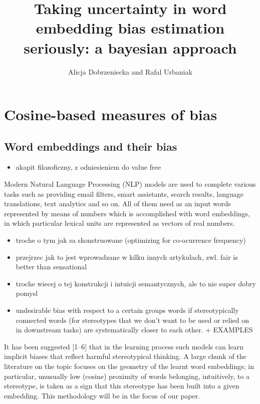 \documentclass[
  10pt,
  dvipsnames,enabledeprecatedfontcommands]{scrartcl}
\title{Taking uncertainty in word embedding bias estimation seriously: a
bayesian approach}
\author{Alicja Dobrzeniecka and Rafal Urbaniak}
\date{}
\providecommand{\tightlist}{%
  \setlength{\itemsep}{0pt}\setlength{\parskip}{0pt}}
\begin{document}
\maketitle

\hypertarget{cosine-based-measures-of-bias}{%
\section{Cosine-based measures of
bias}\label{cosine-based-measures-of-bias}}

\hypertarget{word-embeddings-and-their-bias}{%
\subsection{Word embeddings and their
bias}\label{word-embeddings-and-their-bias}}

\begin{itemize}
\tightlist
\item
  akapit filozoficzny, z odniesieniem do value free
\end{itemize}

Modern Natural Language Processing (NLP) models are used to complete
various tasks such as providing email filters, smart assistants, search
results, language translations, text analytics and so on. All of them
need as an input words represented by means of numbers which is
accomplished with word embeddings, in which particular lexical units are
represented as vectors of real numbers.

\begin{itemize}
\item
  troche o tym jak sa skonstruowane (optimizing for co-ocurrence
  frequency)
\item
  przejrzec jak to jest wprowadzane w kilku innych artykulach, zwl. fair
  is better than sensational
\item
  troche wiecej o tej konstrukcji i intuicji semantycznych, ale to nie
  super dobry pomysl
\item
  undesirable bias with respect to a certain groups words if
  stereotypically connected words (for stereotypes that we don't want to
  be used or relied on in downstream tasks) are systematically closer to
  each other. + EXAMPLES
\end{itemize}

It has been suggested {[}1--6{]} that in the learning process such
models can learn implicit biases that reflect harmful stereotypical
thinking. A large chunk of the literature on the topic focuses on the
geometry of the learnt word embeddings; in particular, unusually low
(cosine) proximity of words belonging, intuitively, to a stereotype, is
taken as a sign that this stereotype has been built into a given
embedding. This methodology will be in the focus of our paper.
\end{document}
